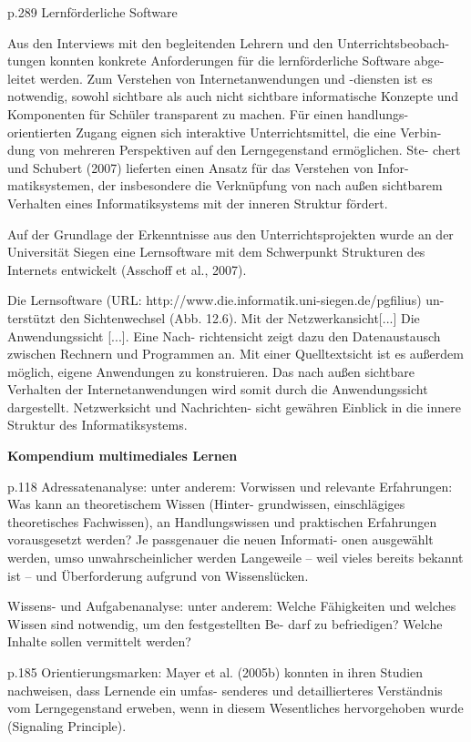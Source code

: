 p.289
Lernförderliche Software 

Aus den Interviews mit den begleitenden Lehrern und den Unterrichtsbeobach-
tungen konnten konkrete Anforderungen für die lernförderliche Software abge-
leitet werden. Zum Verstehen von Internetanwendungen und -diensten ist es 
notwendig, sowohl sichtbare als auch nicht sichtbare informatische Konzepte 
und Komponenten für Schüler transparent zu machen. Für einen handlungs-
orientierten Zugang eignen sich interaktive Unterrichtsmittel, die eine Verbin-
dung  von  mehreren  Perspektiven  auf  den  Lerngegenstand  ermöglichen.  Ste-
chert und Schubert (2007) lieferten einen Ansatz für das Verstehen von Infor-
matiksystemen, der insbesondere die Verknüpfung von nach außen sichtbarem 
Verhalten eines Informatiksystems mit der inneren Struktur fördert.  

Auf  der  Grundlage  der  Erkenntnisse  aus  den  Unterrichtsprojekten  wurde  an 
der Universität Siegen eine Lernsoftware mit dem Schwerpunkt Strukturen des 
Internets entwickelt (Asschoff et al., 2007).  

Die Lernsoftware (URL: http://www.die.informatik.uni-siegen.de/pgfilius) un-
terstützt den Sichtenwechsel (Abb. 12.6). Mit der Netzwerkansicht[...] 
Die Anwendungssicht [...]. Eine Nach-
richtensicht zeigt dazu den Datenaustausch zwischen Rechnern und Programmen 
an.  Mit  einer  Quelltextsicht  ist  es  außerdem  möglich,  eigene  Anwendungen  zu 
konstruieren. Das nach außen sichtbare Verhalten der Internetanwendungen wird 
somit durch die Anwendungssicht dargestellt. Netzwerksicht und Nachrichten-
sicht gewähren Einblick in die innere Struktur des Informatiksystems. 

\textbf{Kompendium multimediales Lernen}

p.118
Adressatenanalyse: unter anderem: 
Vorwissen und relevante Erfahrungen: Was kann an theoretischem Wissen (Hinter-
grundwissen,  einschlägiges  theoretisches  Fachwissen),  an  Handlungswissen  und 
praktischen Erfahrungen vorausgesetzt werden? Je passgenauer die neuen Informati-
onen ausgewählt werden, umso unwahrscheinlicher werden Langeweile – weil vieles 
bereits bekannt ist – und Überforderung aufgrund von Wissenslücken. 

Wissens- und Aufgabenanalyse: unter anderem: 
Welche Fähigkeiten und welches Wissen sind notwendig, um den festgestellten Be-
darf zu befriedigen? Welche Inhalte sollen vermittelt werden? 

p.185
Orientierungsmarken: 
Mayer et al. (2005b) konnten in ihren Studien nachweisen, dass Lernende ein umfas-
senderes und detaillierteres Verständnis vom Lerngegenstand erweben, wenn in diesem 
Wesentliches hervorgehoben wurde (Signaling Principle).

